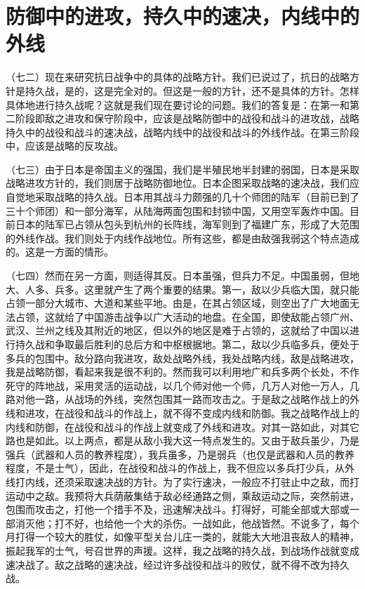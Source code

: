 \section{防御中的进攻，持久中的速决，内线中的外线}

（七二）现在来研究抗日战争中的具体的战略方针。我们已说过了，抗日的战略方针是持久战，是的，这是完全对的。但这是一般的方针，还不是具体的方针。怎样具体地进行持久战呢？这就是我们现在要讨论的问题。我们的答复是：在第一和第二阶段即敌之进攻和保守阶段中，应该是战略防御中的战役和战斗的进攻战，战略持久中的战役和战斗的速决战，战略内线中的战役和战斗的外线作战。在第三阶段中，应该是战略的反攻战。

（七三）由于日本是帝国主义的强国，我们是半殖民地半封建的弱国，日本是采取战略进攻方针的，我们则居于战略防御地位。日本企图采取战略的速决战，我们应自觉地采取战略的持久战。日本用其战斗力颇强的几十个师团的陆军（目前已到了三十个师团）和一部分海军，从陆海两面包围和封锁中国，又用空军轰炸中国。目前日本的陆军已占领从包头到杭州的长阵线，海军则到了福建广东，形成了大范围的外线作战。我们则处于内线作战地位。所有这些，都是由敌强我弱这个特点造成的。这是一方面的情形。

（七四）然而在另一方面，则适得其反。日本虽强，但兵力不足。中国虽弱，但地大、人多、兵多。这里就产生了两个重要的结果。第一，敌以少兵临大国，就只能占领一部分大城市、大道和某些平地。由是，在其占领区域，则空出了广大地面无法占领，这就给了中国游击战争以广大活动的地盘。在全国，即使敌能占领广州、武汉、兰州之线及其附近的地区，但以外的地区是难于占领的，这就给了中国以进行持久战和争取最后胜利的总后方和中枢根据地。第二，敌以少兵临多兵，便处于多兵的包围中。敌分路向我进攻，敌处战略外线，我处战略内线，敌是战略进攻，我是战略防御，看起来我是很不利的。然而我可以利用地广和兵多两个长处，不作死守的阵地战，采用灵活的运动战，以几个师对他一个师，几万人对他一万人，几路对他一路，从战场的外线，突然包围其一路而攻击之。于是敌之战略作战上的外线和进攻，在战役和战斗的作战上，就不得不变成内线和防御。我之战略作战上的内线和防御，在战役和战斗的作战上就变成了外线和进攻。对其一路如此，对其它路也是如此。以上两点，都是从敌小我大这一特点发生的。又由于敌兵虽少，乃是强兵（武器和人员的教养程度），我兵虽多，乃是弱兵（也仅是武器和人员的教养程度，不是士气），因此，在战役和战斗的作战上，我不但应以多兵打少兵，从外线打内线，还须采取速决战的方针。为了实行速决，一般应不打驻止中之敌，而打运动中之敌。我预将大兵荫蔽集结于敌必经通路之侧，乘敌运动之际，突然前进，包围而攻击之，打他一个措手不及，迅速解决战斗。打得好，可能全部或大部或一部消灭他；打不好，也给他一个大的杀伤。一战如此，他战皆然。不说多了，每个月打得一个较大的胜仗，如像平型关台儿庄一类的，就能大大地沮丧敌人的精神，振起我军的士气，号召世界的声援。这样，我之战略的持久战，到战场作战就变成速决战了。敌之战略的速决战，经过许多战役和战斗的败仗，就不得不改为持久战。

